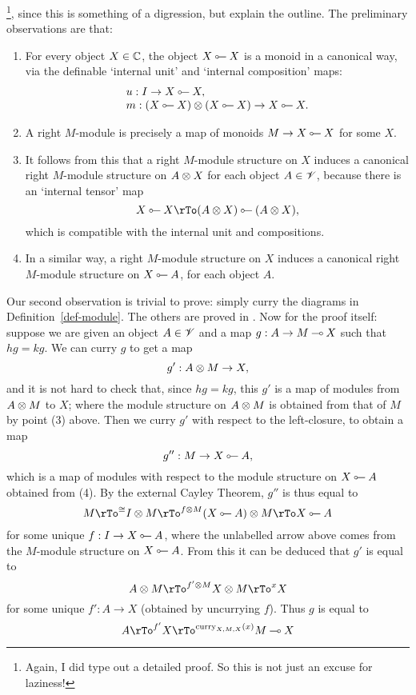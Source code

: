 \documentclass{robinthesisdraft}
\begin{document}
\footnote{Again, I did type out a detailed proof. So this is not
	just an excuse for laziness!},
since this is something of a digression, but explain the outline.
The preliminary observations are that:
\begin{enumerate}
	\item For every object $X\in\mathbb{C}$, the object $X\illol X$
	is a monoid in a canonical way, via the definable `internal unit'
	and `internal composition' maps:
	\[\begin{array}{l}
		u: I \to X\illol X, \\
		m: (X\illol X)\tn(X\illol X) \to X \illol X.
	\end{array}\]
	\item A right $M$-module is
	precisely a map of monoids $M\to X\illol X$ for some $X$.
	\item It follows
	from this that a right $M$-module structure on $X$ induces a canonical
	right $M$-module structure on $A\tn X$ for each object $A\in \mathscr{V}$, because
	there is an `internal tensor' map
	\[
		X\illol X \rTo (A\tn X)\illol(A\tn X),
	\]
	which is compatible with the internal unit and compositions.
	\item In a similar
	way, a right $M$-module structure on $X$ induces a canonical
	right $M$-module structure on $X\illol A$, for each object $A$.
\end{enumerate}
Our second observation is trivial to prove: simply curry the diagrams
in Definition~\ref{def-module}. The others are proved in \citet[Section~1.6]{KellyEnriched}.
%
Now for the proof itself: suppose we are given an object $A\in\mathscr{V}$ and
a map $g: A\to M\mathbin{\multimap} X$ such that $hg=kg$. We can curry $g$ to get a map
\[
	g': A\tn M \to X,
\]
and it is not hard to check that, since $hg=kg$, this $g'$ is a
map of modules from $A\tn M$ to $X$; where the module structure on
$A\tn M$ is obtained from that of $M$ by point (3) above. Then we
curry $g'$ with respect to the left-closure, to obtain a map
\[
	g'': M \to X\illol A,
\]
which is a map of modules with respect to the module
structure on $X\illol A$ obtained from (4). By the
external Cayley Theorem, $g''$ is thus equal to
\[
	M \rTo^{\cong} I\tn M \rTo^{f\tn M} (X\illol A)\tn M
		\rTo X\illol A
\]
for some unique $f: I \to X\illol A$, where the unlabelled
arrow above comes from the $M$-module structure on $X\illol A$.
From this it can be deduced that $g'$ is equal to
\[
	A\tn M \rTo^{f'\tn M} X\tn M \rTo^{x} X
\]
for some unique $f': A\to X$ (obtained by uncurrying $f$).
%
Thus $g$ is equal to
\[
	A \rTo^{f'} X \rTo^{\curry_{X,M,X}(x)} M\lolli X
\]
\end{document}
